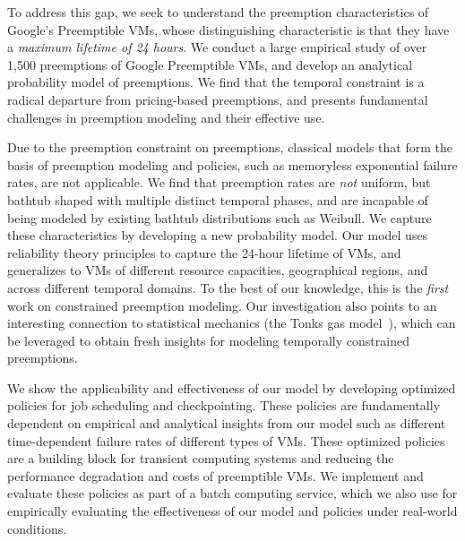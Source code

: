 To address this gap, we seek to understand the preemption characteristics of Google's Preemptible VMs, whose distinguishing characteristic is that they have a \emph{maximum lifetime of 24 hours}. 
We conduct a large empirical study of over 1,500 preemptions of Google Preemptible VMs, and develop an analytical probability model of preemptions. 
We find that the temporal constraint is a radical departure from pricing-based preemptions, and presents fundamental challenges in preemption modeling and their effective use. %



Due to the preemption constraint on preemptions, classical models that form the basis of preemption modeling and policies, such as memoryless exponential failure rates, are not applicable.
We find that preemption rates are \emph{not} uniform, but bathtub shaped with multiple distinct temporal phases, and are incapable of being modeled by existing bathtub distributions such as Weibull. 
We capture these characteristics by developing a new probability model. 
Our model uses reliability theory principles to capture the 24-hour lifetime of VMs, and generalizes to VMs of different resource capacities, geographical regions, and across different temporal domains. 
To the best of our knowledge, this is the \emph{first} work on constrained preemption modeling. 
%
Our investigation also points to an interesting connection to statistical mechanics (the Tonks gas model~\cite{tonks}), which can be leveraged to obtain fresh insights for modeling temporally constrained preemptions. 


We show the applicability and effectiveness of our model by developing optimized policies for job scheduling and  checkpointing. 
These policies are fundamentally dependent on empirical and analytical insights from our model such as different time-dependent failure rates of different types of VMs. 
These optimized policies are a building block for transient computing systems and reducing the performance degradation and costs of preemptible VMs. 
We implement and evaluate these policies as part of a batch computing service, which we also use for empirically evaluating the effectiveness of our model and policies under real-world conditions. 





